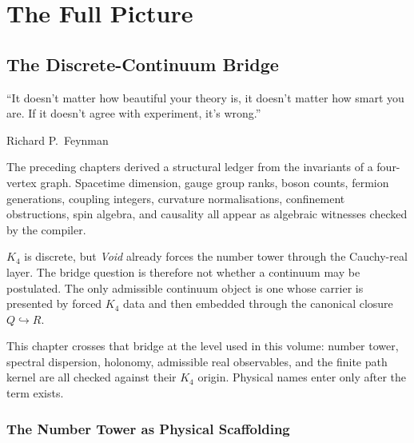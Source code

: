 \documentclass[11pt,a4paper]{book}
\def\mathbb#1{#1}%
\newcommand{\VoidRef}[2]{\textit{#2} (in \textit{Void})}
\begin{document}
\part*{The Full Picture}
\label{part:full-picture}

\chapter{The Discrete-Continuum Bridge}
\label{ch:discrete-continuum-bridge}

\epigraph{``It doesn't matter how beautiful your theory is, it doesn't matter how smart you are. If it doesn't agree with experiment, it's wrong.''}{Richard P.~Feynman}

The preceding chapters derived a structural ledger from the invariants of a four-vertex graph. Spacetime dimension, gauge group ranks, boson counts, fermion generations, coupling integers, curvature normalisations, confinement obstructions, spin algebra, and causality all appear as algebraic witnesses checked by the compiler.

$K_4$ is discrete, but \textit{Void} already forces the number tower through the Cauchy-real layer. The bridge question is therefore not whether a continuum may be postulated. The only admissible continuum object is one whose carrier is presented by forced $K_4$ data and then embedded through the canonical closure $\mathbb{Q} \hookrightarrow \mathbb{R}$.

This chapter crosses that bridge at the level used in this volume: number tower, spectral dispersion, holonomy, admissible real observables, and the finite path kernel are all checked against their $K_4$ origin. Physical names enter only after the term exists.


\section{The Number Tower as Physical Scaffolding}
\label{sec:number-tower-physics}
\end{document}
